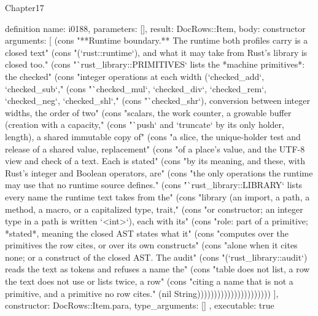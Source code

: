 \begin{lexlean}{Chapter17}
\begin{semanticmodule}
definition{
  name: i0188,
  parameters: [],
  result: DocRows::Item,
  body: constructor{
    arguments: [
      (cons "**Runtime boundary.** The runtime both profiles carry is a closed text" (cons "(`rust::runtime`), and what it may take from Rust's library is closed too." (cons "`rust_library::PRIMITIVES` lists the *machine primitives*: the checked" (cons "integer operations at each width (`checked_add`, `checked_sub`," (cons "`checked_mul`, `checked_div`, `checked_rem`, `checked_neg`, `checked_shl`," (cons "`checked_shr`), conversion between integer widths, the order of two" (cons "scalars, the work counter, a growable buffer (creation with a capacity," (cons "`push` and `truncate` by its only holder, length), a shared immutable copy of" (cons "a slice, the unique-holder test and release of a shared value, replacement" (cons "of a place's value, and the UTF-8 view and check of a text. Each is stated" (cons "by its meaning, and these, with Rust's integer and Boolean operators, are" (cons "the only operations the runtime may use that no runtime source defines." (cons "`rust_library::LIBRARY` lists every name the runtime text takes from the" (cons "library (an import, a path, a method, a macro, or a capitalized type, trait," (cons "or constructor; an integer type in a path is written `<int>`), each with its" (cons "role: part of a primitive; *stated*, meaning the closed AST states what it" (cons "computes over the primitives the row cites, or over its own constructs" (cons "alone when it cites none; or a construct of the closed AST. The audit" (cons "(`rust_library::audit`) reads the text as tokens and refuses a name the" (cons "table does not list, a row the text does not use or lists twice, a row" (cons "citing a name that is not a primitive, and a primitive no row cites." (nil String))))))))))))))))))))))
    ],
    constructor: DocRows::Item.para,
    type_arguments: []
  },
  executable: true
}


\end{semanticmodule}
\end{lexlean}
